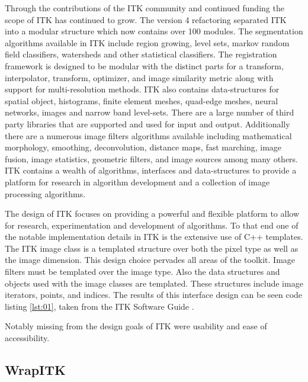 \documentclass{frontiersMED} %
\begin{document}
Through the contributions of the ITK community and continued funding
the scope of ITK has continued to grow. The version 4 refactoring
separated ITK into a modular structure which now contains over 100
modules. The segmentation algorithms available in ITK include region
growing, level sets, markov random field classifiers, watersheds and
other statistical classifiers. The registration framework is designed
to be modular with the distinct parts for a transform, interpolator,
transform, optimizer, and image similarity metric along with support
for multi-resolution methods. ITK also contains data-structures for
spatial object, histograms, finite element meshes, quad-edge meshes,
neural networks, images and narrow band level-sets. There are a large
number of third party libraries that are supported and used for input
and output. Additionally there are a numerous image filters algorithms
available including mathematical morphology, smoothing, deconvolution,
distance maps, fast marching, image fusion, image statistics,
geometric filters, and image sources among many others. ITK contains a
wealth of algorithms, interfaces and data-structures to provide a
platform for research in algorithm development and a collection of
image processing algorithms.

The design of ITK focuses on providing a powerful and flexible
platform to allow for research, experimentation and development of
algorithms. To that end one of the notable implementation details in
ITK is the extensive use of C++ templates. The ITK image class is a
templated structure over both the pixel type as well as the image
dimension. This design choice pervades all areas of the toolkit. Image filters
must be templated over the image type. Also the data structures and objects
used with the image classes are templated. These structures
include image iterators, points, and indices. The results of this
interface design can be seen code listing \ref{lst:01}, taken from the
ITK Software Guide \cite{Ibanez2005}.



Notably missing from the design goals of ITK were usability and ease of
accessibility.


\subsection{WrapITK}
\end{document}
